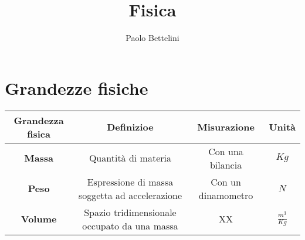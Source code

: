 \documentclass[a4paper]{article}
\title{Fisica}
\author{Paolo Bettelini}
\date{}
\begin{document}
\maketitle
\tableofcontents

\section{Grandezze fisiche}

\begin{center}
    \bgroup{}
    \def\arraystretch{1.25}
    \begin{tabular}{ |c|c|c|c| }
        \hline
        \textbf{Grandezza fisica} & \textbf{Definizioe} & \textbf{Misurazione} & \textbf{Unità} \\
        \hline
        \textbf{Massa} & Quantità di materia & Con una bilancia & \(Kg\) \\
        \hline
        \textbf{Peso} & Espressione di massa soggetta ad accelerazione & Con un dinamometro & \(N\) \\
        \hline
        \textbf{Volume} & Spazio tridimensionale occupato da una massa & XX & \(\frac{m^3}{Kg}\) \\
        \hline
    \end{tabular}
    \egroup{}
\end{center}
\end{document}
